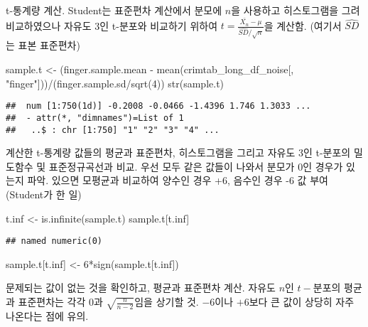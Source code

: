 \documentclass[
]{article}
\newenvironment{Shaded}{\begin{snugshade}}{\end{snugshade}}
\newcommand{\DecValTok}[1]{\textcolor[rgb]{0.00,0.00,0.81}{#1}}
\newcommand{\FunctionTok}[1]{\textcolor[rgb]{0.00,0.00,0.00}{#1}}
\newcommand{\NormalTok}[1]{#1}
\newcommand{\OtherTok}[1]{\textcolor[rgb]{0.56,0.35,0.01}{#1}}
\newcommand{\SpecialCharTok}[1]{\textcolor[rgb]{0.00,0.00,0.00}{#1}}
\newcommand{\StringTok}[1]{\textcolor[rgb]{0.31,0.60,0.02}{#1}}
\begin{document}
t-통계량 계산. Student는 표준편차 계산에서 분모에 \(n\)을 사용하고
히스토그램을 그려 비교하였으나 자유도 3인 t-분포와 비교하기 위하여
\(t=\frac{\bar{X_n}-\mu}{\hat{SD}/\sqrt{n}}\)을 계산함. (여기서
\(\hat{SD}\)는 표본 표준편차)

\begin{Shaded}
\begin{Highlighting}[]
\NormalTok{sample.t }\OtherTok{\textless{}{-}}\NormalTok{ (finger.sample.mean }\SpecialCharTok{{-}} \FunctionTok{mean}\NormalTok{(crimtab\_long\_df\_noise[, }\StringTok{"finger"}\NormalTok{]))}\SpecialCharTok{/}\NormalTok{(finger.sample.sd}\SpecialCharTok{/}\FunctionTok{sqrt}\NormalTok{(}\DecValTok{4}\NormalTok{))}
\FunctionTok{str}\NormalTok{(sample.t)}
\end{Highlighting}
\end{Shaded}

\begin{verbatim}
##  num [1:750(1d)] -0.2008 -0.0466 -1.4396 1.746 1.3033 ...
##  - attr(*, "dimnames")=List of 1
##   ..$ : chr [1:750] "1" "2" "3" "4" ...
\end{verbatim}

계산한 t-통계량 값들의 평균과 표준편차, 히스토그램을 그리고 자유도 3인
t-분포의 밀도함수 및 표준정규곡선과 비교. 우선 모두 같은 값들이 나와서
분모가 0인 경우가 있는지 파악. 있으면 모평균과 비교하여 양수인 경우 +6,
음수인 경우 -6 값 부여(Student가 한 일)

\begin{Shaded}
\begin{Highlighting}[]
\NormalTok{t.inf }\OtherTok{\textless{}{-}} \FunctionTok{is.infinite}\NormalTok{(sample.t)}
\NormalTok{sample.t[t.inf]}
\end{Highlighting}
\end{Shaded}

\begin{verbatim}
## named numeric(0)
\end{verbatim}

\begin{Shaded}
\begin{Highlighting}[]
\NormalTok{sample.t[t.inf] }\OtherTok{\textless{}{-}} \DecValTok{6}\SpecialCharTok{*}\FunctionTok{sign}\NormalTok{(sample.t[t.inf])}
\end{Highlighting}
\end{Shaded}

문제되는 값이 없는 것을 확인하고, 평균과 표준편차 계산. 자유도 \(n\)인
\(t-\)분포의 평균과 표준편차는 각각 0과 \(\sqrt{\frac{n}{n-2}}\)임을
상기할 것. \(-6\)이나 \(+6\)보다 큰 값이 상당히 자주 나온다는 점에 유의.
\end{document}
